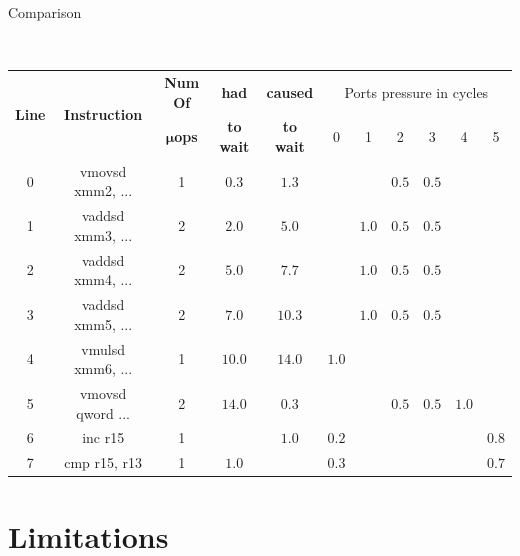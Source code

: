 \documentclass[10pt, tikz,border=2mm, xcolor=dvipsnames]{beamer}
\begin{document}
\begin{frame}[fragile]{Comparison}
\begin{mdframed}[backgroundcolor=light-gray, roundcorner=10pt,leftmargin=1, rightmargin=1, innerleftmargin=15, innertopmargin=5,innerbottommargin=5, outerlinewidth=1, linecolor=light-gray]
\begin{minipage}{0.9\textwidth}
\begin{adjustbox}{height=0.2\textheight,width=0.95\textwidth}
\begin{tabular}
            \hline
    \end{tabular}\end{adjustbox}\\ \vspace{0.5cm}
    \begin{adjustbox}{height=0.17\textheight,width=0.95\textwidth} \begin{tabular}
            {|c|c|c|c|c|c|c|c|c|c|c|}
            \hline
            \multicolumn{1}{|c|}{\multirow{2}{*}{\textbf{Line}}}&\multicolumn{1}{|c|}{\multirow{2}{*}{\textbf{Instruction}}}&\textbf{Num Of}& \textbf{had} & \textbf{caused} & \multicolumn{6}{|c|}{Ports pressure in cycles}\\
            \cline{6-11}
            &&$\boldsymbol{\mu}$\textbf{ops} & \textbf{to wait} & \textbf{to wait} & 0  & 1 & 2 & 3 & 4 & 5 \\ \cline{1-11}
            0&vmovsd xmm2, ... & 1 & $0.3$  & $1.3$  &       &       & $0.5$ & $0.5$ &       &       \\
            1&vaddsd xmm3, ... & 2 & $2.0$  & $5.0$  &       & $1.0$ & $0.5$ & $0.5$ &       &       \\
            2&vaddsd xmm4, ... & 2 & $5.0$  & $7.7$  &       & $1.0$ & $0.5$ & $0.5$ &       &       \\
            3&vaddsd xmm5, ... & 2 & $7.0$  & $10.3$ &       & $1.0$ & $0.5$ & $0.5$ &       &       \\
            4&vmulsd xmm6, ... & 1 & $10.0$ & $14.0$ & $1.0$ &       &       &       &       &       \\
            5&vmovsd qword ... & 2 & $14.0$ & $0.3$  &       &       & $0.5$ & $0.5$ & $1.0$ &       \\
            6&inc r15          & 1 &        & $1.0$  & $0.2$ &       &       &       &       & $0.8$ \\
            7&cmp r15, r13     & 1 & $1.0$  &        & $0.3$ &       &       &       &       & $0.7$ \\
            \hline
            \end{tabular}\end{adjustbox}
        
    \end{minipage}
        \end{mdframed}
\end{frame}



\section{Limitations}
\end{document}
